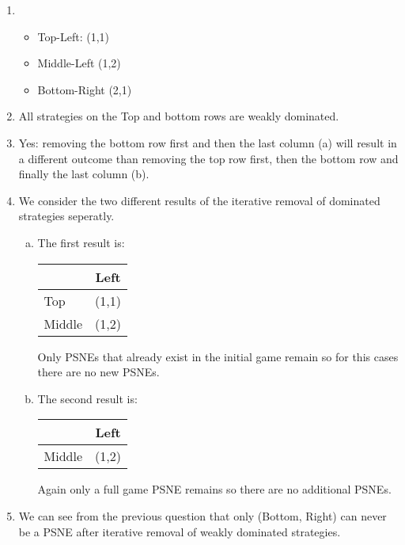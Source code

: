\documentclass[../main.tex]{subfiles}
\begin{document}
\begin{solution} 

    \begin{enumerate}
    	\item 
    		\begin{itemize}
	    		\item Top-Left: (1,1)
	    		\item Middle-Left (1,2)
	    		\item Bottom-Right (2,1)
    		\end{itemize}
    	\item
    		All strategies on the Top and bottom rows are weakly dominated.
    	\item Yes: removing the bottom row first and then the last column (a) will result in a different outcome than removing the top row first, then the bottom row and finally the last column (b).
    	\item We consider the two different results of the iterative removal of dominated strategies seperatly.
			\begin{enumerate}[(a)]
				\item The first result is: \\
					\begin{center}
						\begin{tabular}{|l|c|}
							\hline
							& Left \\
							\hline
							Top & (1,1) \\
							\hline
							Middle & (1,2) \\
							\hline
						\end{tabular}
					\end{center}
					Only PSNEs that already exist in the initial game remain so for this cases there are no new PSNEs.
			\item  The second result is: \\
				\begin{center}
					\begin{tabular}{|l|c|}
						\hline
						& Left \\
						\hline
						Middle & (1,2) \\
						\hline
					\end{tabular}
				\end{center}
				Again only a full game PSNE remains so there are no additional PSNEs.
			\end{enumerate}
    	\item We can see from the previous question that only (Bottom, Right) can never be a PSNE after iterative removal of weakly dominated strategies. 
    \end{enumerate}
\end{solution}
\end{document}
